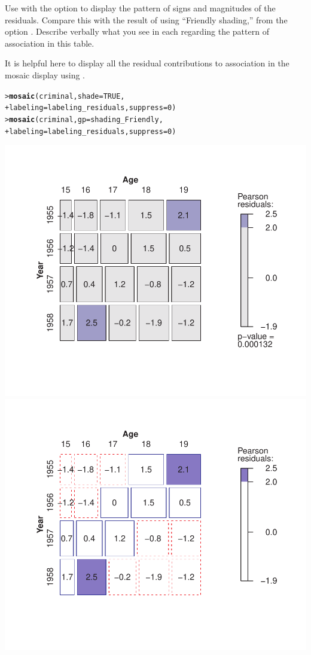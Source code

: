 \documentclass[10pt]{report}\usepackage[]{graphicx}\usepackage[]{color}
\makeatletter
\newcommand{\hlnum}[1]{\textcolor[rgb]{0.686,0.059,0.569}{#1}}%
\newcommand{\hlstd}[1]{\textcolor[rgb]{0.345,0.345,0.345}{#1}}%
\newcommand{\hlkwc}[1]{\textcolor[rgb]{0.333,0.667,0.333}{#1}}%
\newcommand{\hlkwd}[1]{\textcolor[rgb]{0.737,0.353,0.396}{\textbf{#1}}}%
\newenvironment{kframe}{%
 \def\at@end@of@kframe{}%
 \ifinner\ifhmode%
  \def\at@end@of@kframe{\end{minipage}}%
  \begin{minipage}{\columnwidth}%
 \fi\fi%
 \def\FrameCommand##1{\hskip\@totalleftmargin \hskip-\fboxsep
 \colorbox{shadecolor}{##1}\hskip-\fboxsep
     \hskip-\linewidth \hskip-\@totalleftmargin \hskip\columnwidth}%
 \MakeFramed {\advance\hsize-\width
   \@totalleftmargin\z@ \linewidth\hsize
   \@setminipage}}%
 {\par\unskip\endMakeFramed%
 \at@end@of@kframe}
\newenvironment{knitrout}{}{} %
\renewenvironment{knitrout}{\small\renewcommand{\baselinestretch}{.85}}{} %
\makeatother
\begin{document}
\begin{Exercises}
\begin{enumerate*}
\begin{ans}
    \end{ans}
    
    \item Use  with the option  to display the
    pattern of signs and magnitudes of the residuals.  Compare this with the
    result of  using ``Friendly shading,'' from
    the option .  Describe verbally what you see
    in each regarding the pattern of association in this table.
    \begin{ans}
    It is helpful here to display all the residual contributions to association
    in the mosaic display using .
\begin{knitrout}\footnotesize
{}\color{fgcolor}\begin{kframe}
\begin{alltt}
\hlstd{> }\hlkwd{mosaic}\hlstd{(criminal,} \hlkwc{shade}\hlstd{=}\hlnum{TRUE}\hlstd{,}
\hlstd{+ }       \hlkwc{labeling}\hlstd{=labeling_residuals,} \hlkwc{suppress}\hlstd{=}\hlnum{0}\hlstd{)}
\hlstd{> }\hlkwd{mosaic}\hlstd{(criminal,} \hlkwc{gp}\hlstd{=shading_Friendly,}
\hlstd{+ }       \hlkwc{labeling}\hlstd{=labeling_residuals,} \hlkwc{suppress}\hlstd{=}\hlnum{0}\hlstd{)}
\end{alltt}
\end{kframe}

\centerline{\includegraphics[width=.5\textwidth]{soln/fig/ex5_1b-1} 
\includegraphics[width=.5\textwidth]{soln/fig/ex5_1b-2} }




\end{knitrout}
\end{ans}
\end{enumerate*}
\end{Exercises}
\end{document}
